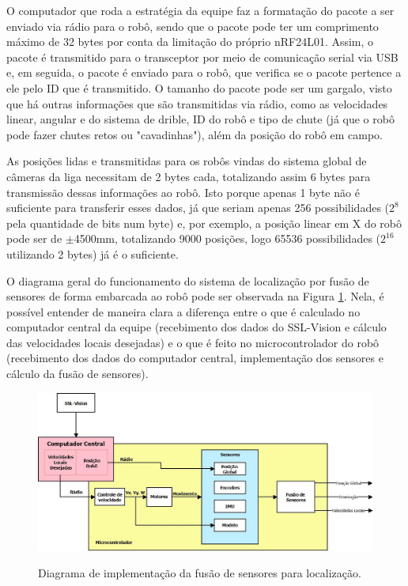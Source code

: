 \documentclass[acronym, symbols, table]{fei}
\begin{document}
		O computador que roda a estratégia da equipe faz a formatação do pacote a ser enviado via rádio para o robô, sendo que o pacote pode ter um comprimento máximo de 32 bytes por conta da limitação do próprio nRF24L01. Assim, o pacote é transmitido para o transceptor por meio de comunicação serial via USB e, em seguida, o pacote é enviado para o robô, que verifica se o pacote pertence a ele pelo ID que é transmitido. O tamanho do pacote pode ser um gargalo, visto que há outras informações que são transmitidas via rádio, como as velocidades linear, angular e do sistema de drible, ID do robô e tipo de chute (já que o robô pode fazer chutes retos ou "cavadinhas"), além da posição do robô em campo.
		
		As posições lidas e transmitidas para os robôs vindas do sistema global de câmeras da liga necessitam de 2 bytes cada, totalizando assim 6 bytes para transmissão dessas informações ao robô. Isto porque apenas 1 byte não é suficiente para transferir esses dados, já que seriam apenas 256 possibilidades ($2^8$ pela quantidade de bits num byte) e, por exemplo, a posição linear em X do robô pode ser de $\pm$4500mm, totalizando 9000 posições, logo 65536 possibilidades ($2^{16}$ utilizando 2 bytes) já é o suficiente.
		
		O diagrama geral do funcionamento do sistema de localização por fusão de sensores de forma embarcada ao robô pode ser observada na Figura \ref{fig:diagrama_implementacao}. Nela, é possível entender de maneira clara a diferença entre o que é calculado no computador central da equipe (recebimento dos dados do SSL-Vision e cálculo das velocidades locais desejadas) e o que é feito no microcontrolador do robô (recebimento dos dados do computador central, implementação dos sensores e cálculo da fusão de sensores).
		
		\begin{figure}[!htb]
			\centering
			\caption{Diagrama de implementação da fusão de sensores para localização.}
			\includegraphics[width=1.00\textwidth]{diagrama_fluxo_implementacao.jpeg}
			\label{fig:diagrama_implementacao}
		\end{figure}
	
\end{document}
